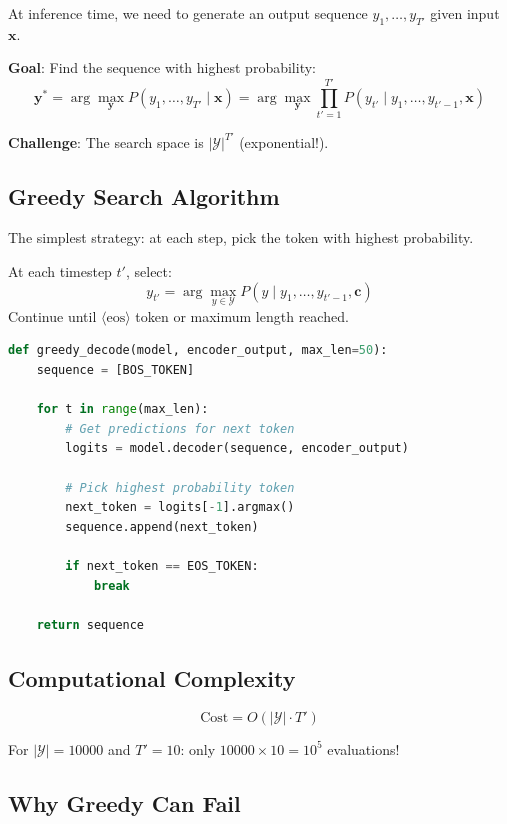 \documentclass{article}
\begin{document}
At inference time, we need to generate an output sequence $y_1, \ldots, y_{T'}$ given input $\mathbf{x}$.

\textbf{Goal}: Find the sequence with highest probability:
\[
\mathbf{y}^* = \arg\max_{\mathbf{y}} P(y_1, \ldots, y_{T'} \mid \mathbf{x})
= \arg\max_{\mathbf{y}} \prod_{t'=1}^{T'} P(y_{t'} \mid y_1, \ldots, y_{t'-1}, \mathbf{x})
\]

\textbf{Challenge}: The search space is $|\mathcal{Y}|^{T'}$ (exponential!).

\subsection{Greedy Search Algorithm}

The simplest strategy: at each step, pick the token with highest probability.

\begin{tcolorbox}[colback=blue!5!white, colframe=blue!50!black, title=Greedy Search (Section 10.8.1)]
At each timestep $t'$, select:
\[
y_{t'} = \arg\max_{y \in \mathcal{Y}} P(y \mid y_1, \ldots, y_{t'-1}, \mathbf{c})
\]
Continue until $\langle \text{eos} \rangle$ token or maximum length reached.
\end{tcolorbox}

\begin{lstlisting}[language=Python, caption=Greedy Search Implementation]
def greedy_decode(model, encoder_output, max_len=50):
    sequence = [BOS_TOKEN]
    
    for t in range(max_len):
        # Get predictions for next token
        logits = model.decoder(sequence, encoder_output)
        
        # Pick highest probability token
        next_token = logits[-1].argmax()
        sequence.append(next_token)
        
        if next_token == EOS_TOKEN:
            break
    
    return sequence
\end{lstlisting}

\subsection{Computational Complexity}

\[
\text{Cost} = O(|\mathcal{Y}| \cdot T')
\]

For $|\mathcal{Y}| = 10000$ and $T' = 10$: only $10000 \times 10 = 10^5$ evaluations!

\subsection{Why Greedy Can Fail}
\end{document}
